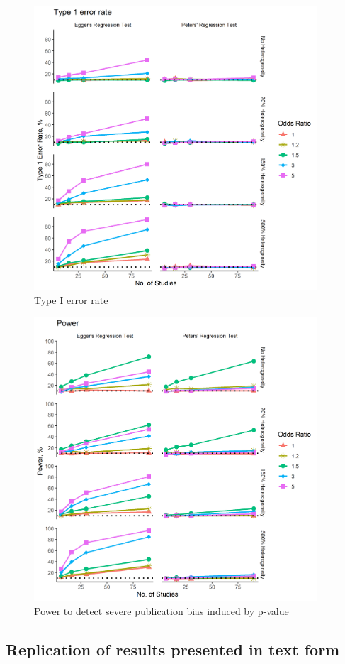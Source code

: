 \documentclass[
  english,
  doc,floatsintext,draftall]{apa6}
\begin{document}
\begin{figure}
\includegraphics[width=300pt]{../figures/type_1_error} \caption{Type I error rate}\label{fig:unnamed-chunk-1}
\end{figure}

\begin{figure}
\includegraphics[width=300pt]{../figures/power_p_severe} \caption{Power to detect severe publication bias induced by p-value}\label{fig:unnamed-chunk-2}
\end{figure}

\hypertarget{replication-of-results-presented-in-text-form}{%
\subsection{Replication of results presented in text form}\label{replication-of-results-presented-in-text-form}}
\end{document}
